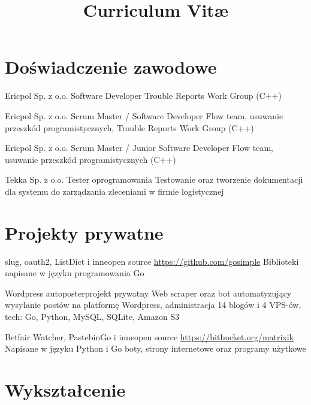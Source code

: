 \documentclass[11pt,a4paper,sans,polish]{moderncv}   %
\title{Curriculum Vit\ae{}}
\begin{document}
\makecvtitle

\vspace{-0.8cm}


\section{Doświadczenie zawodowe}

	{Ericpol Sp. z o.o.}{}{}
	{Software Developer}
	{Trouble Reports Work Group (C++)}

	{Ericpol Sp. z o.o.}{}{}
	{Scrum Master / Software Developer}
	{Flow team, usuwanie przeszkód programistycznych, Trouble Reports Work Group (C++)}

	{Ericpol Sp. z o.o.}{}{}
	{Scrum Master / Junior Software Developer}
	{Flow team, usuwanie przeszkód programistycznych (C++)}

	{Tekka Sp. z o.o.}{}{}
	{Tester oprogramowania}
	{Testowanie oraz tworzenie dokumentacji dla systemu do zarządzania
	zleceniami w firmie logistycznej}


\section{Projekty prywatne}

	{slug, oauth2, ListDict i inne}{open source}{}
	{\url{https://github.com/gosimple}}
	{Biblioteki napisane w języku programowania Go}

	{Wordpress autoposter}{projekt prywatny}{}
	{}
	{Web scraper oraz bot automatyzujący wysyłanie postów na platformę Wordpress,
		administracja 14 blogów i 4 VPS-ów, tech: Go, Python, MySQL, SQLite, Amazon S3}

	{Betfair Watcher, PastebinGo i inne}{open source}{}
	{\url{https://bitbucket.org/matrixik}}
	{Napisane w języku Python i Go boty, strony internetowe oraz programy użytkowe}


\section{Wykształcenie}

\vspace{-0.2cm}
\end{document}
